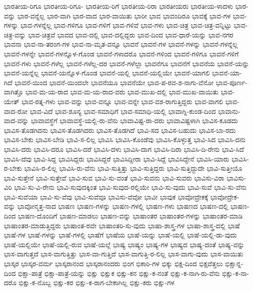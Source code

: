 {ಭಾರತೀಯ-ರಿಗೂ
ಭಾರತೀಯ-ರಿಗೂ-
ಭಾರತೀಯ-ರಿಗೆ
ಭಾರತೀಯ-ರಿರಾ
ಭಾರತೀಯರು
ಭಾರತೀಯ-ಳಾದಳು
ಭಾರ-ವನ್ನು
ಭಾರ-ವನ್ನೆಲ್ಲ
ಭಾರ-ವಾಗಿ
ಭಾರ-ವಾದ
ಭಾರ-ವಾಯಿತು
ಭಾರೀ
ಭಾವ
ಭಾವಂದಿರೂ
ಭಾವಕ್ಕೆ
ಭಾವ-ಗಳ
ಭಾವ-ಗಳನ್ನು
ಭಾವ-ಗಳನ್ನೆಲ್ಲ
ಭಾವ-ಗಳಿಗೂ
ಭಾವ-ಗಳಿಗೆ
ಭಾವ-ಗಳಿವೆ
ಭಾವ-ಗಳು
ಭಾವ-ಚಿತ್ರ
ಭಾವ-ಚಿತ್ರ-ವನ್ನಿಟ್ಟು
ಭಾವ-ಚಿತ್ರ-ವನ್ನು
ಭಾವ-ಚಿತ್ರವೆ
ಭಾವದ
ಭಾವ-ದಲ್ಲಿ
ಭಾವ-ದಲ್ಲಿದ್ದರು
ಭಾವ-ದಿಂದ
ಭಾವ-ಧಾರೆ-ಯನ್ನು
ಭಾವ-ನಗರ
ಭಾವನಾ
ಭಾವ-ನಾ-ತರಂಗ-ಗಳ
ಭಾವ-ನಾ-ಮೃತ-ವನ್ನೂ
ಭಾವನೆ
ಭಾವನೆ-ಗಳ
ಭಾವನೆ-ಗಳನ್ನು
ಭಾವನೆ-ಗಳನ್ನೆಲ್ಲ
ಭಾವನೆ-ಗಳನ್ನೇ
ಭಾವನೆ-ಗಳನ್ನೊಳ-ಗೊಂಡ
ಭಾವನೆ-ಗಳಾದರೊ
ಭಾವನೆ-ಗಳಿಂದ
ಭಾವನೆ-ಗಳಿಗೂ
ಭಾವನೆ-ಗಳಿಗೆ
ಭಾವನೆ-ಗಳು
ಭಾವನೆ-ಗಳೆಲ್ಲ
ಭಾವನೆ-ಗಳೆಲ್ಲ-ದರ
ಭಾವನೆ-ಗಳೆಲ್ಲಾ
ಭಾವನೆಗೂ
ಭಾವನೆಗೆ
ಭಾವನೆಯ
ಭಾವನೆ-ಯನ್ನು
ಭಾವನೆ-ಯನ್ನೆಲ್ಲ
ಭಾವನೆ-ಯನ್ನೊಳ-ಗೊಂಡ
ಭಾವನೆ-ಯಲ್ಲಿ
ಭಾವನೆ-ಯಲ್ಲಿಯೇ
ಭಾವನೆ-ಯಾಗಲಿ
ಭಾವನೆ-ಯಾ-ಗಿದೆ
ಭಾವನೆ-ಯಿಂದ
ಭಾವನೆ-ಯಿಂದಲೇ
ಭಾವನೆಯೂ
ಭಾವನೆಯೇ
ಭಾವ-ಪ-ರವ-ಶ-ನಾಗು-ವೆನೋ
ಭಾವ-ಪೂರ್ಣ-ವಾಗಿತ್ತೊ
ಭಾವ-ಮ-ಯ-ರಾದ
ಭಾವ-ಮ-ಯ-ರಾದ-ವರು
ಭಾವ-ಮುಖ-ದಲ್ಲಿ
ಭಾವ-ಮುಖ-ವಾಯಿತು
ಭಾವ-ಯೇತ್
ಭಾವ-ರತ್ನ-ಗಳು
ಭಾವ-ವನ್ನು
ಭಾವ-ವನ್ನೂ
ಭಾವ-ವನ್ನೇ
ಭಾವ-ವಶ-ರಾಗುತ್ತಿದ್ದರು
ಭಾವ-ವಾಗಲಿ
ಭಾವ-ವಾದ-ರೋ
ಭಾವ-ವಿದೆ
ಭಾವ-ಶೂನ್ಯ
ಭಾವ-ಸಮಾಧಿಗೆ
ಭಾವ-ಸಮಾಧಿ-ಯಲ್ಲಿ
ಭಾವಾಗ್ನಿ-ಕುಂಡ-ದಿಂದ
ಭಾವಾನು-ವಾದ-ವನ್ನು
ಭಾವಾವಸ್ಥೆಗೆ
ಭಾವಾವಸ್ಥೆ-ಯಲ್ಲಿ-ರು-ವೆನು
ಭಾವಾವಿಷ್ಟ-ರಾ-ದರು
ಭಾವಾವಿಷ್ಟಳಾಗಿ
ಭಾವಿಸ-ಕೂಡದು
ಭಾವಿಸ-ತೊಡಗಿದನು
ಭಾವಿಸ-ತೊಡಗಿದರು
ಭಾವಿಸ-ತೊಡಗಿದೆ
ಭಾವಿ-ಸದ
ಭಾವಿಸ-ಬಹುದು
ಭಾವಿಸ-ಬಾ-ರದು
ಭಾವಿಸ-ಬೇಕು
ಭಾವಿಸ-ಬೇಡಿ
ಭಾವಿ-ಸ-ಲಿಲ್ಲ
ಭಾವಿಸಿ
ಭಾವಿಸಿ-ಕೊಂಡೆವು
ಭಾವಿಸಿ-ಕೊಳ್ಳುತ್ತ
ಭಾವಿ-ಸಿದ
ಭಾವಿಸಿ-ದನು
ಭಾವಿಸಿ-ದರು
ಭಾವಿಸಿ-ದರೂ
ಭಾವಿಸಿ-ದರೆ
ಭಾವಿಸಿ-ದಳು
ಭಾವಿಸಿ-ದಾಗ
ಭಾವಿಸಿ-ದಿರಾ
ಭಾವಿಸಿ-ದಿ-ರೇನು
ಭಾವಿ-ಸಿದೆ
ಭಾವಿಸಿ-ದೆವು
ಭಾವಿ-ಸಿದ್ದ
ಭಾವಿಸಿದ್ದರು
ಭಾವಿಸಿದ್ದರೆ
ಭಾವಿಸಿದ್ದೀರಾ
ಭಾವಿ-ಸಿದ್ದೆ
ಭಾವಿಸಿದ್ದೇನೆ
ಭಾವಿಸಿ-ಯಾರು
ಭಾವಿಸಿ-ರ-ಬೇಕು
ಭಾವಿಸಿ-ರ-ಲಿಲ್ಲ
ಭಾವಿಸಿ-ರು-ವೆನು
ಭಾವಿ-ಸುತ್ತಿತ್ತು
ಭಾವಿ-ಸುತ್ತಿದ್ದರು
ಭಾವಿ-ಸುತ್ತಿದ್ದುದೇ
ಭಾವಿ-ಸುತ್ತೀಯೊ
ಭಾವಿ-ಸುತ್ತೇನೆ
ಭಾವಿ-ಸುತ್ತೇವೆ
ಭಾವಿ-ಸುವ
ಭಾವಿ-ಸು-ವಂತೆ
ಭಾವಿ-ಸುವನು
ಭಾವಿ-ಸುವರು
ಭಾವಿಸು-ವಿರಾ
ಭಾವಿಸು-ವಿರಿ
ಭಾವಿ-ಸು-ವಿ-ರೇನು
ಭಾವಿ-ಸುವುದಕ್ಕಿಂತ
ಭಾವಿ-ಸುವುದ-ರಲ್ಲಿಯೇ
ಭಾವಿ-ಸು-ವುದು
ಭಾವಿ-ಸುವೆ
ಭಾವಿ-ಸು-ವೆನು
ಭಾವಿ-ಸುವೆಯಾ
ಭಾವಿ-ಸು-ವೆವು
ಭಾವಿ-ಸುವೆವೂ
ಭಾವಿಸು-ವೆವೋ
ಭಾವೀ
ಭಾವುಕ
ಭಾವೋದ್ರೇಕಕ್ಕೆ
ಭಾವೋದ್ರೇಕ-ವನ್ನು
ಭಾವೋನ್ಮತ್ತ-ನಾದ
ಭಾಷಣ
ಭಾಷಣ-ಗಳನ್ನು
ಭಾಷಣ-ಗಳಲ್ಲಿ
ಭಾಷಣ-ಗಳು
ಭಾಷಣದ
ಭಾಷಣ-ದಲ್ಲಿ
ಭಾಷಣ-ದಿಂದ
ಭಾಷಣ-ದೊಂದಿಗೆ
ಭಾಷಣ-ಮಾಡಲು
ಭಾಷಣ-ವನ್ನು
ಭಾಷಾಂತರ
ಭಾಷಾಂತರ-ಗಳನ್ನು
ಭಾಷಾಂತರ-ಮಾಡಿ
ಭಾಷಾಂತರ-ಮಾಡುತ್ತಿದ್ದರು
ಭಾಷಾಂತ-ರವೇ
ಭಾಷಾಂತರಿ-ಸು-ವುದು
ಭಾಷಾ-ಶಾಸ್ತ್ರ-ಗಳ
ಭಾಷಾ-ಶಾಸ್ತ್ರ-ದಲ್ಲಿ
ಭಾಷೆ
ಭಾಷೆ-ಗಳ
ಭಾಷೆ-ಗಳನ್ನು
ಭಾಷೆ-ಗಳಲ್ಲಿ
ಭಾಷೆಗೆ
ಭಾಷೆಯ
ಭಾಷೆ-ಯನ್ನು
ಭಾಷೆ-ಯಲ್ಲಿ
ಭಾಷೆ-ಯಲ್ಲಿ-ಡು-ವುದು
ಭಾಷೆ-ಯಲ್ಲಿಯೇ
ಭಾಷೆ-ಯಲ್ಲಿ-ರುವ
ಭಾಷೆ-ಯಲ್ಲೆ
ಭಾಷ್ಯ
ಭಾಷ್ಯಂ
ಭಾಷ್ಯ-ಗಳ
ಭಾಷ್ಯದ
ಭಾಷ್ಯ-ದಂತೆ
ಭಾಷ್ಯ-ವನ್ನು
ಭಾಸ-ವಾಗುತ್ತದೆ
ಭಾಸ-ವಾಗುತ್ತಿತ್ತು
ಭಾಸ-ವಾ-ಗುತ್ತಿದೆ
ಭಾಸ-ವಾಗುತ್ತಿ-ರ-ಲಿಲ್ಲ
ಭಾಸ-ವಾಗು-ವುದು
ಭಾಸ-ವಾಯಿತು
ಭಾಸ್ಕರ
ಭಾಸ್ಕರ-ವರ್ಮ
ಭಾಸ್ಕರಾನಂದ
ಭಾಸ್ಕರಾನಂದರು
ಭಿಂಗ
ಭಿಕಾರಿ-ಗಳ
ಭಿಕ್ಕು
ಭಿಕ್ಷ-ದಿಂದ
ಭಿಕ್ಷವೆತ್ತಲು
ಭಿಕ್ಷಾನ್ನ-ದಿಂದ
ಭಿಕ್ಷಾ-ಪಾತ್ರೆ
ಭಿಕ್ಷಾ-ಪಾತ್ರೆ-ಯನ್ನು
ಭಿಕ್ಷು
ಭಿಕ್ಷುಕ
ಭಿಕ್ಷು-ಕನ
ಭಿಕ್ಷು-ಕ-ನಂತೆ
ಭಿಕ್ಷು-ಕ-ನಾಗಿ-ರು-ವೆನು
ಭಿಕ್ಷು-ಕ-ನಾ-ದರೊ
ಭಿಕ್ಷು-ಕ-ನೊಬ್ಬ
ಭಿಕ್ಷು-ಕರ
ಭಿಕ್ಷು-ಕ-ರಾಗ-ಬೇಕಾಗಿಲ್ಲ
ಭಿಕ್ಷು-ಕರು
ಭಿಕ್ಷು-ಗಳ
}

